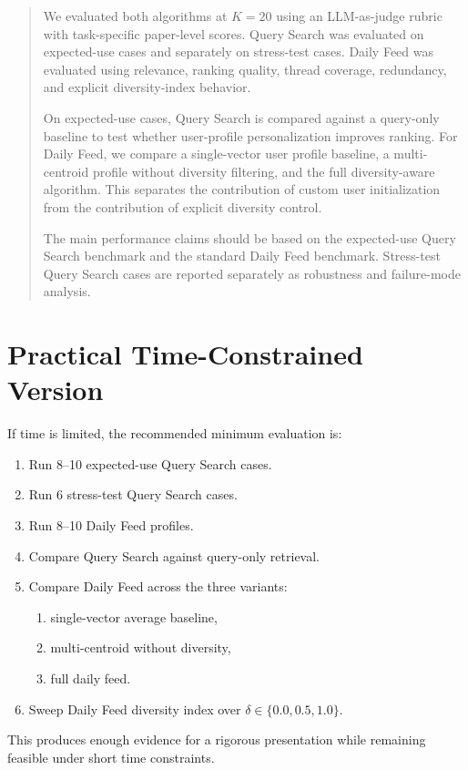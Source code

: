 \documentclass[11pt]{article}
\begin{document}
\begin{quote}
We evaluated both algorithms at $K=20$ using an LLM-as-judge rubric with task-specific paper-level scores. Query Search was evaluated on expected-use cases and separately on stress-test cases. Daily Feed was evaluated using relevance, ranking quality, thread coverage, redundancy, and explicit diversity-index behavior.

On expected-use cases, Query Search is compared against a query-only baseline to test whether user-profile personalization improves ranking. For Daily Feed, we compare a single-vector user profile baseline, a multi-centroid profile without diversity filtering, and the full diversity-aware algorithm. This separates the contribution of custom user initialization from the contribution of explicit diversity control.

The main performance claims should be based on the expected-use Query Search benchmark and the standard Daily Feed benchmark. Stress-test Query Search cases are reported separately as robustness and failure-mode analysis.
\end{quote}

\section{Practical Time-Constrained Version}

If time is limited, the recommended minimum evaluation is:

\begin{enumerate}[leftmargin=*]
    \item Run 8--10 expected-use Query Search cases.
    \item Run 6 stress-test Query Search cases.
    \item Run 8--10 Daily Feed profiles.
    \item Compare Query Search against query-only retrieval.
    \item Compare Daily Feed across the three variants:
    \begin{enumerate}
        \item single-vector average baseline,
        \item multi-centroid without diversity,
        \item full daily feed.
    \end{enumerate}
    \item Sweep Daily Feed diversity index over $\delta \in \{0.0,0.5,1.0\}$.
\end{enumerate}

This produces enough evidence for a rigorous presentation while remaining feasible under short time constraints.
\end{document}
